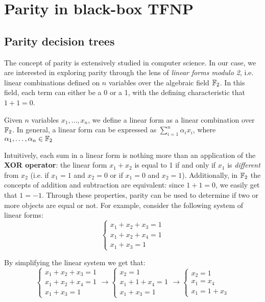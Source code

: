 
\chapter{Parity in black-box \textsf{TFNP}} \label{chap:parity-tfnp}

\section{Parity decision trees}

The concept of parity is extensively studied in computer science. In our case, we are interested in exploring parity through the lens of \textit{linear forms modulo 2}, i.e. linear combinations defined on $n$ variables over the algebraic field $\mathbb{F}_2$. In this field, each term can either be a 0 or a 1, with the defining characteristic that $1+1 = 0$.

\begin{definition}
 Given $n$ variables $x_1, \ldots, x_n$, we define a linear form as a linear combination over $\mathbb{F}_2$. In general, a linear form can be expressed as $\sum\limits_{i = 1}^n \alpha_i x_i$, where $\alpha_1, \ldots, \alpha_n \in \mathbb{F}_2$
\end{definition}

Intuitively, each sum in a linear form is nothing more than an application of the \textbf{XOR operator}: the linear form $x_1 + x_2$ is equal to 1 if and only if $x_1$ is \textit{different} from $x_2$ (i.e. if $x_1 = 1$ and $x_2 = 0$ or if $x_1 = 0$ and $x_2 = 1$). Additionally, in $\mathbb{F}_2$ the concepts of addition and subtraction are equivalent: since $1+1 = 0$, we easily get that $1 = -1$. Through these properties, parity can be used to determine if two or more objects are equal or not. For example, consider the following system of linear forms:
\[\left \{ \begin{array}{l}
 x_1 + x_2 + x_3 = 1 \\
 x_1 + x_2 + x_4 = 1 \\
 x_1 + x_3 = 1
\end{array} \right .\]

By simplifying the linear system we get that:
\[\left \{ \begin{array}{l}
 x_1 + x_2 + x_3 = 1 \\
 x_1 + x_2 + x_4 = 1 \\
 x_1 + x_3 = 1
\end{array} \right . \longrightarrow
\left \{ \begin{array}{l}
 x_2 = 1\\
 x_1 + 1 + x_4 = 1 \\
 x_1 + x_3 = 1
\end{array} \right . \longrightarrow
\left \{ \begin{array}{l}
 x_2 = 1\\
 x_1 = x_4 \\
 x_1 = 1+x_3
\end{array} \right .\]

